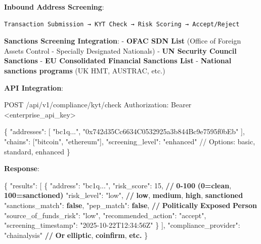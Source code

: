 \documentclass[
  11pt,
]{article}
\newenvironment{Shaded}{\begin{snugshade}}{\end{snugshade}}
\newcommand{\DataTypeTok}[1]{\textcolor[rgb]{0.13,0.29,0.53}{#1}}
\newcommand{\DecValTok}[1]{\textcolor[rgb]{0.00,0.00,0.81}{#1}}
\newcommand{\ErrorTok}[1]{\textcolor[rgb]{0.64,0.00,0.00}{\textbf{#1}}}
\newcommand{\FunctionTok}[1]{\textcolor[rgb]{0.00,0.00,0.00}{#1}}
\newcommand{\KeywordTok}[1]{\textcolor[rgb]{0.13,0.29,0.53}{\textbf{#1}}}
\newcommand{\NormalTok}[1]{#1}
\newcommand{\OtherTok}[1]{\textcolor[rgb]{0.56,0.35,0.01}{#1}}
\newcommand{\StringTok}[1]{\textcolor[rgb]{0.31,0.60,0.02}{#1}}
\begin{document}
\textbf{Inbound Address Screening}:

\begin{verbatim}
Transaction Submission → KYT Check → Risk Scoring → Accept/Reject
\end{verbatim}

\textbf{Sanctions Screening Integration}: - \textbf{OFAC SDN List}
(Office of Foreign Assets Control - Specially Designated Nationals) -
\textbf{UN Security Council Sanctions} - \textbf{EU Consolidated
Financial Sanctions List} - \textbf{National sanctions programs} (UK
HMT, AUSTRAC, etc.)

\textbf{API Integration}:

\begin{Shaded}
\begin{Highlighting}[]
\NormalTok{POST /api/v1/compliance/kyt/check}
\NormalTok{Authorization: Bearer \textless{}enterprise\_api\_key\textgreater{}}

\NormalTok{\{}
\NormalTok{  "addresses": [}
\NormalTok{    "bc1q...",}
\NormalTok{    "0x742d35Cc6634C0532925a3b844Bc9e7595f0bEb"}
\NormalTok{  ],}
\NormalTok{  "chains": ["bitcoin", "ethereum"],}
\NormalTok{  "screening\_level": "enhanced"  // Options: basic, standard, enhanced}
\NormalTok{\}}
\end{Highlighting}
\end{Shaded}

\textbf{Response}:

\begin{Shaded}
\begin{Highlighting}[]
\FunctionTok{\{}
  \DataTypeTok{"results"}\FunctionTok{:} \OtherTok{[}
    \FunctionTok{\{}
      \DataTypeTok{"address"}\FunctionTok{:} \StringTok{"bc1q..."}\FunctionTok{,}
      \DataTypeTok{"risk\_score"}\FunctionTok{:} \DecValTok{15}\FunctionTok{,}  \ErrorTok{//} \ErrorTok{0{-}100} \ErrorTok{(0=clean}\FunctionTok{,} \ErrorTok{100=sanctioned)}
      \DataTypeTok{"risk\_level"}\FunctionTok{:} \StringTok{"low"}\FunctionTok{,}  \ErrorTok{//} \ErrorTok{low}\FunctionTok{,} \ErrorTok{medium}\FunctionTok{,} \ErrorTok{high}\FunctionTok{,} \ErrorTok{sanctioned}
      \DataTypeTok{"sanctions\_match"}\FunctionTok{:} \KeywordTok{false}\FunctionTok{,}
      \DataTypeTok{"pep\_match"}\FunctionTok{:} \KeywordTok{false}\FunctionTok{,}  \ErrorTok{//} \ErrorTok{Politically} \ErrorTok{Exposed} \ErrorTok{Person}
      \DataTypeTok{"source\_of\_funds\_risk"}\FunctionTok{:} \StringTok{"low"}\FunctionTok{,}
      \DataTypeTok{"recommended\_action"}\FunctionTok{:} \StringTok{"accept"}\FunctionTok{,}
      \DataTypeTok{"screening\_timestamp"}\FunctionTok{:} \StringTok{"2025{-}10{-}22T12:34:56Z"}
    \FunctionTok{\}}
  \OtherTok{]}\FunctionTok{,}
  \DataTypeTok{"compliance\_provider"}\FunctionTok{:} \StringTok{"chainalysis"}  \ErrorTok{//} \ErrorTok{Or} \ErrorTok{elliptic}\FunctionTok{,} \ErrorTok{coinfirm}\FunctionTok{,} \ErrorTok{etc.}
\FunctionTok{\}}
\end{Highlighting}
\end{Shaded}
\end{document}
